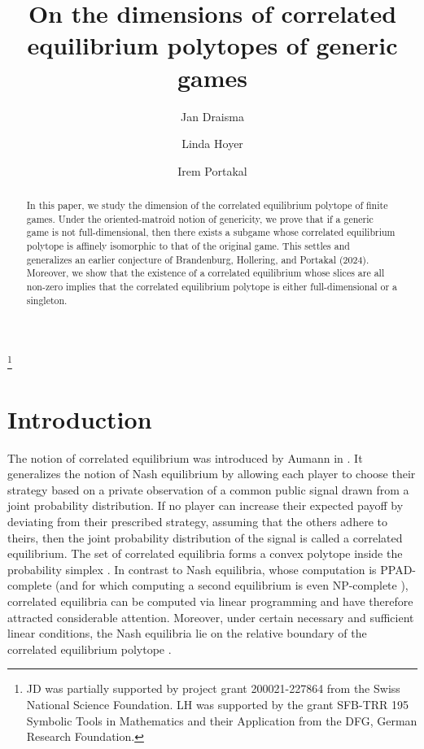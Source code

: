 \documentclass[11pt]{amsart}
\theoremstyle{definition}
\numberwithin{subcase}{case}
\begin{document}
\title{On the dimensions of correlated equilibrium polytopes of generic games}
\author{Jan Draisma}\address{Mathematical Institute, Sidlerstrasse 5,
3012 Bern, Switzerland}
\author{Linda Hoyer}\address{RWTH Aachen University}
\author{Irem Portakal}\address{Max Planck Institute for Mathematics in the Sciences}

\thanks{JD was partially supported by project grant 200021-227864 from the Swiss National Science Foundation. LH was supported by the grant SFB-TRR 195 Symbolic Tools in Mathematics and their Application from the DFG, German Research Foundation.}


\begin{abstract}
In this paper, we study the dimension of the correlated equilibrium polytope of finite games. Under the oriented-matroid notion of genericity, we prove that if a generic game is not full-dimensional, then there exists a subgame whose correlated equilibrium polytope is affinely isomorphic to that of the original game. This settles and generalizes an earlier conjecture of Brandenburg, Hollering, and Portakal (2024). Moreover, we show that the existence of a correlated equilibrium whose slices are all non-zero implies that the correlated equilibrium polytope is either full-dimensional or a singleton.
\end{abstract}
\maketitle
\section{Introduction}
The notion of correlated equilibrium was introduced by Aumann in \cite{Aumann1974Subjectivity}. It generalizes the notion of Nash equilibrium \cite{nash1950equilibrium} by allowing each player to choose their strategy based on a private observation of a common public signal drawn from a joint probability distribution. If no player can increase their expected payoff by deviating from their prescribed strategy, assuming that the others adhere to theirs, then the joint probability distribution of the signal is called a correlated equilibrium. The set of correlated equilibria forms a convex polytope inside the probability simplex \cite{Aumann87}. In contrast to Nash equilibria, whose computation is PPAD-complete \cite{chen2006settling, daskalakis2009complexity} (and for which computing a second equilibrium is even NP-complete \cite[Corollary 2]{conitzer2008new}), correlated equilibria can be computed via linear programming and have therefore attracted considerable attention. Moreover, under certain necessary and sufficient linear conditions, the Nash equilibria lie on the relative boundary of the correlated equilibrium polytope \cite[Section 6.7]{Viossat2005}.
\end{document}

